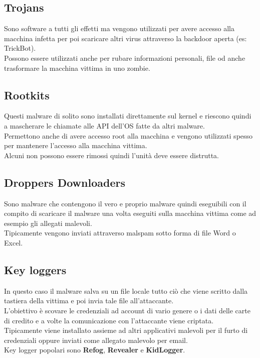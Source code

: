 \subsection{Trojans}
Sono software a tutti gli effetti ma vengono utilizzati per avere accesso alla macchina infetta per poi scaricare altri virus attraverso la backdoor aperta (es: TrickBot).\\
Possono essere utilizzati anche per rubare informazioni personali, file od anche trasformare la macchina vittima in uno zombie.

\subsection{Rootkits}
Questi malware di solito sono installati direttamente sul kernel e riescono quindi a mascherare le chiamate alle \acrshort{API} dell'\acrshort{OS} fatte da altri malware.\\
Permettono anche di avere accesso root alla macchina e vengono utilizzati spesso per mantenere l'accesso alla macchina vittima.\\
Alcuni non possono essere rimossi quindi l'unità deve essere distrutta.

\subsection{Droppers Downloaders}
Sono malware che contengono il vero e proprio malware quindi eseguibili con il compito di scaricare il malware una volta eseguiti sulla macchina vittima come ad esempio gli allegati malevoli.\\
Tipicamente vengono inviati attraverso malspam sotto forma di file Word o Excel.

\subsection{Key loggers}
In questo caso il malware salva su un file locale tutto ciò che viene scritto dalla tastiera della vittima e poi invia tale file all'attaccante.\\
L'obiettivo è scovare le credenziali ad account di vario genere o i dati delle carte di credito e a volte la comunicazione con l'attaccante viene criptata.\\
Tipicamente viene installato assieme ad altri applicativi malevoli per il furto di credenziali oppure inviati come allegato malevolo per email.\\
Key logger popolari sono \textbf{Refog}, \textbf{Revealer} e \textbf{KidLogger}.

